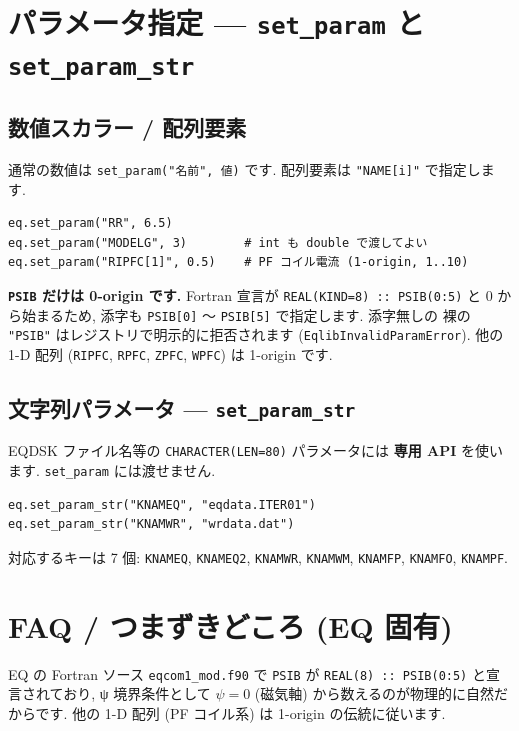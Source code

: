 \documentclass[11pt,a4paper]{report}
\begin{document}
\section{パラメータ指定 — \texttt{set\_param} と \texttt{set\_param\_str}}

\subsection{数値スカラー / 配列要素}

通常の数値は \texttt{set\_param("名前", 値)} です. 配列要素は
\texttt{"NAME[i]"} で指定します.

\begin{lstlisting}[style=py]
eq.set_param("RR", 6.5)
eq.set_param("MODELG", 3)        # int も double で渡してよい
eq.set_param("RIPFC[1]", 0.5)    # PF コイル電流 (1-origin, 1..10)
\end{lstlisting}

\begin{warn}
\textbf{\texttt{PSIB} だけは 0-origin です.} Fortran 宣言が
\texttt{REAL(KIND=8) :: PSIB(0:5)} と 0 から始まるため, 添字も
\texttt{PSIB[0]} 〜 \texttt{PSIB[5]} で指定します. 添字無しの
裸の \texttt{"PSIB"} はレジストリで明示的に拒否されます
(\texttt{EqlibInvalidParamError}). 他の 1-D 配列 (\texttt{RIPFC},
\texttt{RPFC}, \texttt{ZPFC}, \texttt{WPFC}) は 1-origin です.
\end{warn}

\subsection{文字列パラメータ — \texttt{set\_param\_str}}

EQDSK ファイル名等の \texttt{CHARACTER(LEN=80)} パラメータには
\textbf{専用 API} を使います. \texttt{set\_param} には渡せません.

\begin{lstlisting}[style=py]
eq.set_param_str("KNAMEQ", "eqdata.ITER01")
eq.set_param_str("KNAMWR", "wrdata.dat")
\end{lstlisting}

対応するキーは 7 個: \texttt{KNAMEQ}, \texttt{KNAMEQ2},
\texttt{KNAMWR}, \texttt{KNAMWM}, \texttt{KNAMFP}, \texttt{KNAMFO},
\texttt{KNAMPF}.

\section{FAQ / つまずきどころ (EQ 固有)}

\begin{faq}
EQ の Fortran ソース \texttt{eqcom1\_mod.f90} で \texttt{PSIB} が
\texttt{REAL(8) :: PSIB(0:5)} と宣言されており, ψ 境界条件として
\(\psi = 0\) (磁気軸) から数えるのが物理的に自然だからです.
他の 1-D 配列 (PF コイル系) は 1-origin の伝統に従います.
\end{faq}
\end{document}
